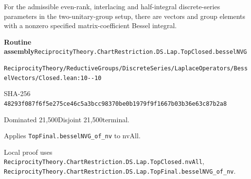 
\begin{formalstatement}[D025]\label{decomp:D025}
For the admissible even-rank, interlacing and half-integral discrete-series parameters in the two-unitary-group setup, there are vectors and group elements with a nonzero specified matrix-coefficient Bessel integral.
\end{formalstatement}
{\small\raggedright\noindent\textsf{\bfseries Routine assembly}\quad \nolinkurl{ReciprocityTheory.ChartRestriction.DS.Lap.TopClosed.besselNVG}\par\noindent \nolinkurl{ReciprocityTheory/ReductiveGroups/DiscreteSeries/LaplaceOperators/BesselVectors/Closed.lean:10--10}\par\noindent SHA-256 \nolinkurl{48293f087f6f5e275ce46c5a3bcc98370be0b1979f9f1667b03b36e63c87b2a8}\par\noindent Dominated 21,500\quad Disjoint 21,500\quad terminal.\par}
Applies \nolinkurl{TopFinal.besselNVG_of_nv} to nvAll.
{\small\raggedright Local proof uses \nolinkurl{ReciprocityTheory.ChartRestriction.DS.Lap.TopClosed.nvAll}, \nolinkurl{ReciprocityTheory.ChartRestriction.DS.Lap.TopFinal.besselNVG_of_nv}.\par}
